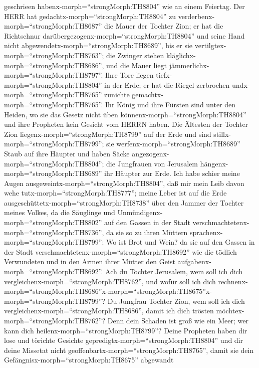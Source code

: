 geschrieen habenx-morph=``strongMorph:TH8804'' wie an einem Feiertag.
 Der HERR hat gedachtx-morph=``strongMorph:TH8804'' zu
verderbenx-morph=``strongMorph:TH8687'' die Mauer der Tochter Zion; er
hat die Richtschnur darübergezogenx-morph=``strongMorph:TH8804'' und
seine Hand nicht abgewendetx-morph=``strongMorph:TH8689'', bis er sie
vertilgtex-morph=``strongMorph:TH8763''; die Zwinger stehen
kläglichx-morph=``strongMorph:TH8686'', und die Mauer liegt
jämmerlichx-morph=``strongMorph:TH8797''.  Ihre Tore liegen
tiefx-morph=``strongMorph:TH8804'' in der Erde; er hat die Riegel
zerbrochen undx-morph=``strongMorph:TH8765'' zunichte
gemachtx-morph=``strongMorph:TH8765''. Ihr König und ihre Fürsten sind
unter den Heiden, wo sie das Gesetz nicht üben
könnenx-morph=``strongMorph:TH8804'' und ihre Propheten kein Gesicht vom
HERRN haben.  Die Ältesten der Tochter Zion
liegenx-morph=``strongMorph:TH8799'' auf der Erde und sind
stillx-morph=``strongMorph:TH8799''; sie
werfenx-morph=``strongMorph:TH8689'' Staub auf ihre Häupter und haben
Säcke angezogenx-morph=``strongMorph:TH8804''; die Jungfrauen von
Jerusalem hängenx-morph=``strongMorph:TH8689'' ihr Häupter zur Erde.
 Ich habe schier meine Augen
ausgeweintx-morph=``strongMorph:TH8804'', daß mir mein Leib davon wehe
tutx-morph=``strongMorph:TH8777''; meine Leber ist auf die Erde
ausgeschüttetx-morph=``strongMorph:TH8738'' über den Jammer der Tochter
meines Volkes, da die Säuglinge und
Unmündigenx-morph=``strongMorph:TH8802'' auf den Gassen in der Stadt
verschmachtetenx-morph=``strongMorph:TH8736'',  da sie so
zu ihren Müttern sprachenx-morph=``strongMorph:TH8799'': Wo ist Brot und
Wein? da sie auf den Gassen in der Stadt
verschmachtetenx-morph=``strongMorph:TH8692'' wie die tödlich
Verwundeten und in den Armen ihrer Mütter den Geist
aufgabenx-morph=``strongMorph:TH8692''.  Ach du Tochter
Jerusalem, wem soll ich dich vergleichenx-morph=``strongMorph:TH8762'',
und wofür soll ich dich
rechnenx-morph=``strongMorph:TH8686''\textbar x-morph=``strongMorph:TH8675''x-morph=``strongMorph:TH8799''?
Du Jungfrau Tochter Zion, wem soll ich dich
vergleichenx-morph=``strongMorph:TH8686'', damit ich dich trösten
möchtex-morph=``strongMorph:TH8762''? Denn dein Schaden ist groß wie ein
Meer; wer kann dich heilenx-morph=``strongMorph:TH8799''? 
Deine Propheten haben dir lose und törichte Gesichte
gepredigtx-morph=``strongMorph:TH8804'' und dir deine Missetat nicht
geoffenbartx-morph=``strongMorph:TH8765'', damit sie dein
Gefängnisx-morph=``strongMorph:TH8675'' abgewandt
